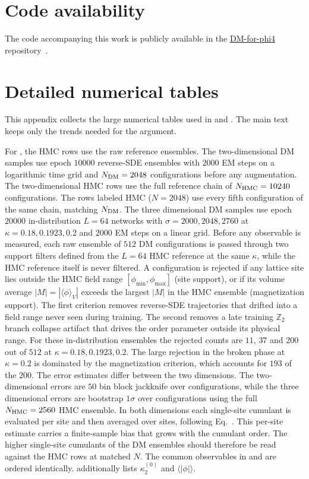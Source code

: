 \documentclass[reprint,twocolumn,superscriptaddress,preprintnumbers,amsmath,amssymb,aps,prd,floatfix]{revtex4-2}
\def\Eq#1{Eq.~\labelcref{#1}} \def\Eqs#1{Eqs.~\labelcref{#1}}
\begin{document}
\section*{Code availability}
The code accompanying this work is publicly available in the \href{https://github.com/Yangyang-Tan/DM-for-phi4}{DM-for-phi4} repository~\cite{DM-for-phi4}.

\appendix

\section{Detailed numerical tables}
\label{app:numerical_tables}

This appendix collects the large numerical tables used in  and . The main text keeps only the trends needed for the argument.

For , the HMC rows use the raw reference ensembles. The two-dimensional DM samples use epoch $10000$ reverse-SDE ensembles with $2000$ EM steps on a logarithmic time grid and $N_{\rm DM}=2048$ configurations before any augmentation. The two-dimensional HMC rows use the full reference chain of $N_{\rm HMC}=10240$ configurations. The rows labeled HMC ($N{=}2048$) use every fifth configuration of the same chain, matching $N_{\rm DM}$. The three dimensional DM samples use epoch $20000$ in-distribution $L=64$ networks with $\sigma=2000,2048,2760$ at $\kappa=0.18,0.1923,0.2$ and $2000$ EM steps on a linear grid. Before any observable is measured, each raw ensemble of $512$ DM configurations is passed through two support filters defined from the $L=64$ HMC reference at the same $\kappa$, while the HMC reference itself is never filtered. A configuration is rejected if any lattice site lies outside the HMC field range $[\phi_{\min},\phi_{\max}]$ (site support), or if its volume average $|M|=|\langle\phi\rangle_V|$ exceeds the largest $|M|$ in the HMC ensemble (magnetization support). The first criterion removes reverse-SDE trajectories that drifted into a field range never seen during training. The second removes a late training $\mathbb{Z}_2$ branch collapse artifact that drives the order parameter outside its physical range. For these in-distribution ensembles the rejected counts are $11$, $37$ and $200$ out of $512$ at $\kappa=0.18,0.1923,0.2$. The large rejection in the broken phase at $\kappa=0.2$ is dominated by the magnetization criterion, which accounts for $193$ of the $200$. The error estimates differ between the two dimensions. The two-dimensional errors are $50$ bin block jackknife over configurations, while the three dimensional errors are bootstrap $1\sigma$ over configurations using the full $N_{\rm HMC}=2560$ HMC ensemble. In both dimensions each single-site cumulant is evaluated per site and then averaged over sites, following \Eq{eq:site_cumulants_avg}. This per-site estimate carries a finite-sample bias that grows with the cumulant order. The higher single-site cumulants of the DM ensembles should therefore be read against the HMC rows at matched $N$. The common observables in  and  are ordered identically.  additionally lists $\kappa^{(0)}_2$ and $\langle|\phi|\rangle$.
\end{document}
